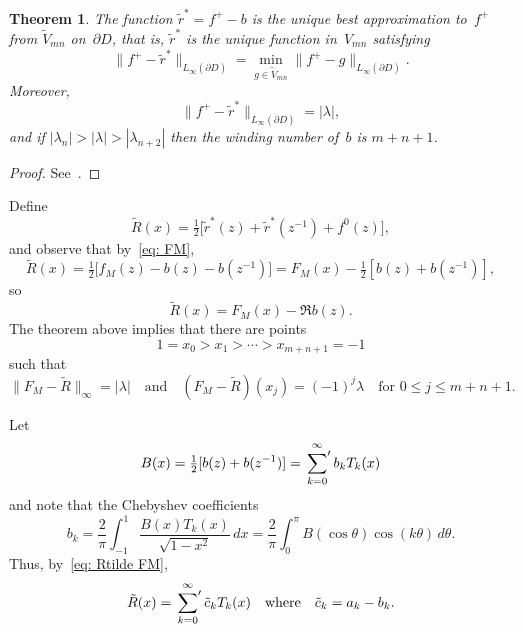 \documentclass[12pt,a4paper]{article}
\newtheorem{theorem}{Theorem}
\begin{document}
\begin{theorem}
The function $\tilde r^*=f^+-b$ is the unique best approximation to~$f^+$
from $\tilde V_{mn}$ on~$\partial D$, that is, $\tilde r^*$ is the unique 
function in~$V_{mn}$ satisfying
\[
\|f^+-\tilde r^*\|_{L_\infty(\partial D)}=\min_{g\in\tilde V_{mn}}
\|f^+-g\|_{L_\infty(\partial D)}.
\]
Moreover, 
\[
\|f^+-\tilde r^*\|_{L_\infty(\partial D)}=|\lambda|,
\]
and if $|\lambda_n|>|\lambda|>|\lambda_{n+2}|$ then the winding number 
of~$b$ is $m+n+1$.  
\end{theorem}
\begin{proof}
See~\cite[Theorem~1]{TrefethenGutknecht1983}.
\end{proof}

Define
\[
\tilde R(x)=\tfrac12\bigl[\tilde r^*(z)+\tilde r^*(z^{-1})+f^0(z)\bigr],
\]
and observe that by~\eqref{eq: FM},
\begin{equation}\label{eq: Rtilde FM}
\tilde R(x)=\tfrac12\bigl[f_M(z)-b(z)-b(z^{-1})\bigr]
    =F_M(x)-\tfrac12[b(z)+b(z^{-1})],
\end{equation}
so
\[
\tilde R(x)=F_M(x)-\Re b(z).
\]
The theorem above implies that there are points
\[
1=x_0>x_1>\cdots>x_{m+n+1}=-1
\]
such that
\[
\|F_M-\tilde R\|_\infty=|\lambda|\quad\text{and}\quad
(F_M-\tilde R)(x_j)=(-1)^j\lambda\quad\text{for $0\le j\le m+n+1$.}
\]

Let
\[
B(x)=\tfrac12[b(z)+b(z^{-1})]=\sideset{}{'}\sum_{k=0}^\infty b_kT_k(x)
\]
and note that the Chebyshev coefficients
\[
b_k=\frac{2}{\pi}\int_{-1}^1\frac{B(x)T_k(x)}{\sqrt{1-x^2}}\,dx
    =\frac{2}{\pi}\int_0^\pi B(\cos\theta)\cos(k\theta)\,d\theta.
\]
Thus, by~\eqref{eq: Rtilde FM},
\[
\tilde R(x)=\sideset{}{'}\sum_{k=0}^\infty\tilde c_kT_k(x)
\quad\text{where}\quad\tilde c_k=a_k-b_k.
\]
\end{document}
